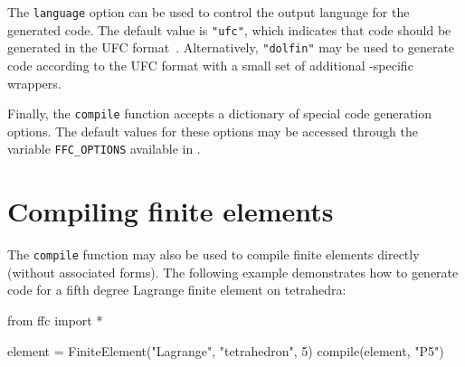 The \texttt{language} option can be used to control the output
language for the generated code. The default value is \texttt{"ufc"},
which indicates that code should be generated in the UFC
format~\cite{www:ufc,ufcmanual}. Alternatively, \texttt{"dolfin"} may
be used to generate code according to the UFC format with a small set
of additional \dolfin{}-specific wrappers.

Finally, the \texttt{compile} function accepts a dictionary of special
code generation options. The default values for these options may be
accessed through the variable \texttt{FFC\_OPTIONS} available in
\ffc{}.

\section{Compiling finite elements}

The \texttt{compile} function may also be used to compile finite
elements directly (without associated forms). The following example
demonstrates how to generate code for a fifth degree Lagrange finite
element on tetrahedra:
\begin{code}
from ffc import *

element = FiniteElement("Lagrange", "tetrahedron", 5)
compile(element, "P5")
\end{code}
